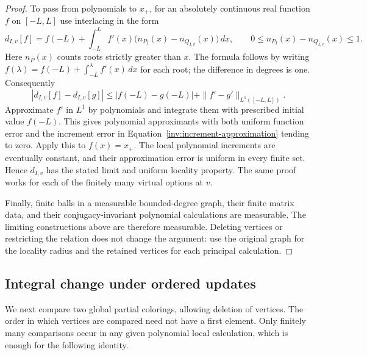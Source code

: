 \begin{proof}
To pass from polynomials to $x_+$, for an absolutely continuous real
function $f$ on $[-L,L]$ use interlacing in the form
\begin{equation}\label{inv:ac-increment}
 d_{I,v}[f]
 =f(-L)+\int_{-L}^{L} f'(x)
           \bigl(n_{P_I}(x)-n_{Q_{I,v}}(x)\bigr)\,dx,
 \qquad
 0\leq n_{P_I}(x)-n_{Q_{I,v}}(x)\leq1.
\end{equation}
Here $n_P(x)$ counts roots strictly greater than $x$.  The formula follows
by writing $f(\lambda)=f(-L)+\int_{-L}^{\lambda}f'(x)\,dx$ for each root;
the difference in degrees is one.  Consequently
\begin{equation}\label{inv:increment-approximation}
 |d_{I,v}[f]-d_{I,v}[g]|
 \leq |f(-L)-g(-L)|+\|f'-g'\|_{L^1([-L,L])}.
\end{equation}
Approximate $f'$ in $L^1$ by polynomials and integrate them with prescribed
initial value $f(-L)$.  This gives polynomial approximants with both uniform
function error and the increment error in
Equation~\eqref{inv:increment-approximation} tending to zero.  Apply this
to $f(x)=x_+$.  The local polynomial increments are eventually constant,
and their approximation error is uniform in every finite set.  Hence
$d_{I,v}$ has the stated limit and uniform locality property.  The same
proof works for each of the finitely many virtual options at $v$.

Finally, finite balls in a measurable bounded-degree graph, their finite
matrix data, and their conjugacy-invariant polynomial calculations are
measurable.  The limiting constructions above are therefore measurable.
Deleting vertices or restricting the relation does not change the argument:
use the original graph for the locality radius and the retained vertices
for each principal calculation.
\end{proof}

\subsection{Integral change under ordered updates}

We next compare two global partial colorings, allowing deletion of vertices.
The order in which vertices are compared need not have a first element.
Only finitely many comparisons occur in any given polynomial local
calculation, which is enough for the following identity.

